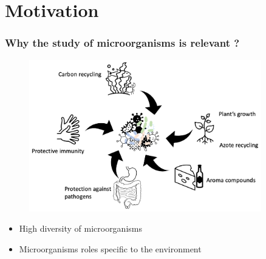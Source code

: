 \documentclass[8pt]{beamer}
\begin{document}
\section{Motivation}

\begin{frame}
\frametitle{Why the study of microorganisms is relevant ?}
\begin{figure}[t]
\centering   
\includegraphics[width=0.9\textwidth]{figures/bacterial-env.pdf}
\end{figure}
\begin{block}{}
\begin{itemize}
\item High diversity of microorganisms
\item Microorganisms roles specific to the environment \tiny\citep{10.1093/chemse/bjh067,BELKAID2014121,Zhang2015,Hoorman2011,McSweeney2000}
\end{itemize}
\end{block}
\end{frame}
\end{document}
